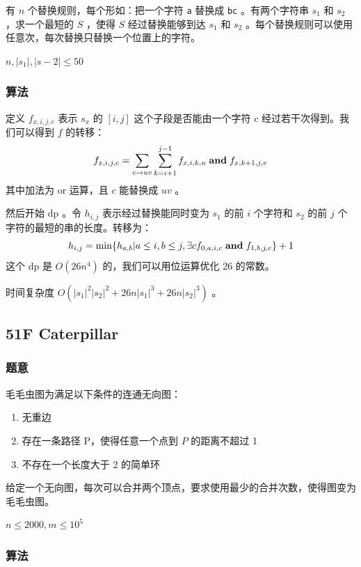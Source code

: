\documentclass[11pt]{article}
\begin{document}
    有 $n$ 个替换规则，每个形如：把一个字符 \texttt{a} 替换成 \texttt{bc} 。有两个字符串 $s_1$ 和 $s_2$ ，求一个最短的 $S$ ，使得 $S$ 经过替换能够到达 $s_1$ 和 $s_2$ 。每个替换规则可以使用任意次，每次替换只替换一个位置上的字符。

    $n, |s_1|, |s-2| \leq 50$
\subsubsection{算法}
\label{sec-4-2-2}

    定义 $f_{x, i, j, c}$ 表示 $s_x$ 的 $[i, j]$ 这个子段是否能由一个字符 $c$ 经过若干次得到。我们可以得到 $f$ 的转移：
    $$f_{x, i, j, c} = \sum_{c \to uv} \sum_{k = i + 1}^{j - 1} f_{x, i, k, u} \hspace{0.1cm} \textbf{and} \hspace{0.1cm} f_{x, k + 1, j, v}$$
    其中加法为 or 运算，且 $c$ 能替换成 $uv$ 。

    然后开始 dp 。令 $h_{i, j}$ 表示经过替换能同时变为 $s_1$ 的前 $i$ 个字符和 $s_2$ 的前 $j$ 个字符的最短的串的长度。转移为：
    $$h_{i, j} = \min \{h_{a, b} \vert a \leq i, b \leq j, \exists c f_{0, a, i, c} \hspace{0.1cm} \textbf{and} \hspace{0.1cm} f_{1, b, j, c} \} + 1$$
    这个 dp 是 $O(26 n^4)$ 的，我们可以用位运算优化 26 的常数。

    时间复杂度 $O(|s_1|^2 |s_2|^2 + 26 n |s_1|^3 + 26 n |s_2|^3)$ 。
\subsection{51F   Caterpillar}
\label{sec-4-3}
\subsubsection{题意}
\label{sec-4-3-1}

\begin{definition}
    毛毛虫图为满足以下条件的连通无向图：
\begin{enumerate}
\item 无重边
\item 存在一条路径 P，使得任意一个点到 $P$ 的距离不超过 1
\item 不存在一个长度大于 2 的简单环
\end{enumerate}
\end{definition}

    给定一个无向图，每次可以合并两个顶点，要求使用最少的合并次数，使得图变为毛毛虫图。

    $n \leq 2000, m \leq 10^5$
\subsubsection{算法}
\label{sec-4-3-2}
\end{document}
